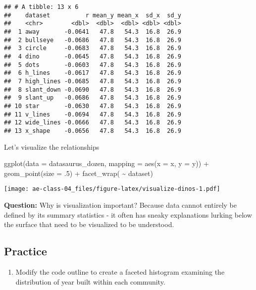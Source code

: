 \documentclass[
]{article}
\newenvironment{Shaded}{\begin{snugshade}}{\end{snugshade}}
\newcommand{\AttributeTok}[1]{\textcolor[rgb]{0.77,0.63,0.00}{#1}}
\newcommand{\DecValTok}[1]{\textcolor[rgb]{0.00,0.00,0.81}{#1}}
\newcommand{\FunctionTok}[1]{\textcolor[rgb]{0.00,0.00,0.00}{#1}}
\newcommand{\NormalTok}[1]{#1}
\newcommand{\SpecialCharTok}[1]{\textcolor[rgb]{0.00,0.00,0.00}{#1}}
\providecommand{\tightlist}{%
  \setlength{\itemsep}{0pt}\setlength{\parskip}{0pt}}
\begin{document}
\begin{verbatim}
## # A tibble: 13 x 6
##    dataset          r mean_y mean_x  sd_x  sd_y
##    <chr>        <dbl>  <dbl>  <dbl> <dbl> <dbl>
##  1 away       -0.0641   47.8   54.3  16.8  26.9
##  2 bullseye   -0.0686   47.8   54.3  16.8  26.9
##  3 circle     -0.0683   47.8   54.3  16.8  26.9
##  4 dino       -0.0645   47.8   54.3  16.8  26.9
##  5 dots       -0.0603   47.8   54.3  16.8  26.9
##  6 h_lines    -0.0617   47.8   54.3  16.8  26.9
##  7 high_lines -0.0685   47.8   54.3  16.8  26.9
##  8 slant_down -0.0690   47.8   54.3  16.8  26.9
##  9 slant_up   -0.0686   47.8   54.3  16.8  26.9
## 10 star       -0.0630   47.8   54.3  16.8  26.9
## 11 v_lines    -0.0694   47.8   54.3  16.8  26.9
## 12 wide_lines -0.0666   47.8   54.3  16.8  26.9
## 13 x_shape    -0.0656   47.8   54.3  16.8  26.9
\end{verbatim}

Let's visualize the relationships

\begin{Shaded}
\begin{Highlighting}[]
\FunctionTok{ggplot}\NormalTok{(}\AttributeTok{data =}\NormalTok{ datasaurus\_dozen, }
       \AttributeTok{mapping =} \FunctionTok{aes}\NormalTok{(}\AttributeTok{x =}\NormalTok{ x, }\AttributeTok{y =}\NormalTok{ y)) }\SpecialCharTok{+} 
   \FunctionTok{geom\_point}\NormalTok{(}\AttributeTok{size =}\NormalTok{ .}\DecValTok{5}\NormalTok{) }\SpecialCharTok{+} 
   \FunctionTok{facet\_wrap}\NormalTok{( }\SpecialCharTok{\textasciitilde{}}\NormalTok{ dataset)}
\end{Highlighting}
\end{Shaded}

\texttt{[image: ae-class-04\_files/figure-latex/visualize-dinos-1.pdf]}

\textbf{Question:} Why is visualization important? Because data cannot
entirely be defined by its summary statistics - it often has sneaky
explanations lurking below the surface that need to be visualized to be
understood.

\hypertarget{practice}{%
\subsection{Practice}\label{practice}}

\begin{enumerate}
\def\labelenumi{(\arabic{enumi})}
\tightlist
\item
  Modify the code outline to create a faceted histogram examining the
  distribution of year built within each community.
\end{enumerate}
\end{document}
